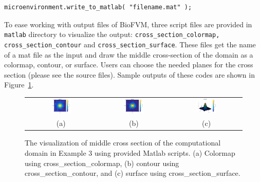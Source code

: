 \documentclass[11pt]{article}
\begin{document}
\begin{verbatim}
microenvironment.write_to_matlab( "filename.mat" );
\end{verbatim}

To ease working with output files of BioFVM, three script files are provided in \verb:matlab: directory to visualize the output: \verb:cross_section_colormap, cross_section_contour: and \verb:cross_section_surface:. These files get the name of a mat file as the input and draw the middle cross-section of the domain as a colormap, contour, or surface. Users can choose the needed planes for the cross section (please see the source files). Sample outputs of these codes are shown in Figure~\ref{Sample_matlab_figs}.

\begin{figure}[h]
\centering
\begin{tabular}{ccc}
\includegraphics[width=0.3\textwidth]{./figures/sample_colormap.png} &
\includegraphics[width=0.3\textwidth]{./figures/sample_contour.png} &
\includegraphics[width=0.3\textwidth]{./figures/sample_surface.png} \\
(a) & (b) & (c)\\
\end{tabular}
\caption{The visualization of middle cross section of the computational domain in Example 3 using provided Matlab scripts. (a) Colormap using \scriptsize{cross\_section\_colormap}, (b) contour using \scriptsize{cross\_section\_contour}, and (c) surface using \scriptsize{cross\_section\_surface}.  }
\label{Sample_matlab_figs}
\end{figure}
\end{document}
